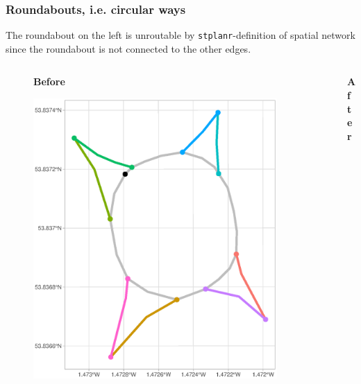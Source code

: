 \documentclass[c,10pt,pdftex]{beamer}
\begin{document}
\begin{frame}
  \frametitle{Roundabouts, i.e. circular ways}
  \vspace{-0.25cm}
  The roundabout on the left is unroutable by \texttt{stplanr}-definition of spatial network since the roundabout is not connected to the other edges.  
  \vspace{-0.55cm}
  \begin{columns}
    \begin{column}{0.5\linewidth}
      \begin{figure}
      \centering
      \large \textbf{Before} \par \medskip
      \includegraphics[width = 0.9\linewidth, trim = {0 0 0 4cm}, clip]{images/roundabout1}
      \end{figure}
    \end{column}
    \begin{column}{0.5\linewidth}
      \begin{figure}
      \centering
      \large \textbf{After} \par \medskip

\end{figure}
\end{column}
\end{columns}
\end{frame}
\end{document}
